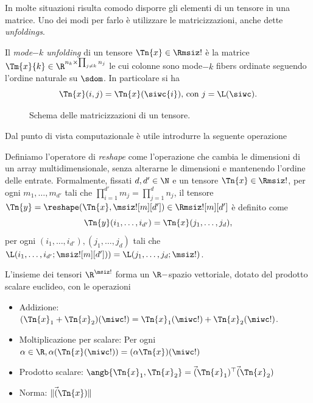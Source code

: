 In molte situazioni risulta comodo disporre gli elementi di un tensore in una matrice. Uno dei modi
per farlo è utilizzare le matricizzazioni, anche dette \emph{unfoldings}.

\begin{definition}
  Il \emph{mode$-k$ unfolding} di un tensore $ \Tn{x} \in \Rmsiz! $ è la matrice $ \Tm{x}{k} \in \R^{n_k \times
  \prod_{j\neq k}n_j} $ le cui colonne sono mode$ -k $ fibers ordinate seguendo l'ordine naturale
  su $ \sdom $. In particolare si ha
  \[
  \Tn{x}(i,j) = \Tn{x}(\siwc{i}) \text{, con } j = \L(\siwc)
  .\] 
\end{definition}

\begin{figure}[ht]
  \centering
  
  \caption{Schema delle matricizzazioni di un tensore.}
  \label{fig:unfoldings}
\end{figure}

Dal punto di vista computazionale è utile introdurre la seguente operazione

\begin{definition}[Reshape]
  Definiamo l'operatore di \emph{reshape} come l'operazione che cambia le dimensioni di un array
  multidimensionale, senza alterarne le dimensioni e mantenendo l'ordine delle entrate. Formalmente,
  fissati $ d, d' \in \N$ e un tensore $ \Tn{x} \in \Rmsiz! $, per ogni $ m_1, \ldots, m_{d'} $ tali
  che $ \prod_{i=1}^{d'} m_j = \prod_{j = 1}^{d} n_j$, il tensore $ \Tn{y} = \reshape(\Tn{x},
  \msiz![m][d']) \in \Rmsiz![m][d'] $ è definito come
  \[
  \Tn{y}(i_1, \ldots, i_{d'})= \Tn{x}(j_1, \ldots, j_d) 
,\] 
 per ogni $(i_1, \ldots, i_{d'}),(j_1, \ldots,
  j_d) $ tali che $ \L(i_1, \ldots, i_{d'}; \msiz![m][d'])) = \L(j_1, \ldots,
  j_d; \msiz!)$.
\end{definition}

\begin{remark}
  L'insieme dei tensori $ \R^{\msiz!} $ forma un $ \R- $spazio vettoriale, dotato del prodotto
  scalare euclideo, con le operazioni
  \begin{itemize}
    \item Addizione: $(\Tn{x}_1 + \Tn{x}_2)(\miwc!) = \Tn{x}_1(\miwc!) + \Tn{x}_2(\miwc!)$.
    \item Moltiplicazione per scalare: Per ogni $ \alpha \in \R, \alpha (\Tn{x}(\miwc!)) = (\alpha
      \Tn{x})(\miwc!)$
    \item Prodotto scalare: $ \angb{\Tn{x}_1, \Tn{x}_2} = \vec(\Tn{x}_1)^{\top} \vec(\Tn{x}_2)$
    \item Norma: $\| \vec(\Tn{x})\|$
  \end{itemize}
\end{remark}

